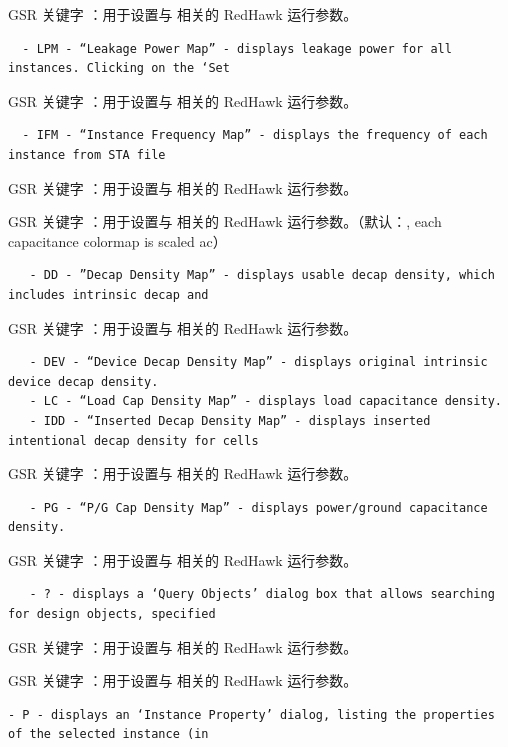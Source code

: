 GSR 关键字 ：用于设置与  相关的 RedHawk 运行参数。

\begin{lstlisting}
  - LPM - “Leakage Power Map” - displays leakage power for all instances. Clicking on the ‘Set
\end{lstlisting}

GSR 关键字 ：用于设置与  相关的 RedHawk 运行参数。

\begin{lstlisting}
  - IFM - “Instance Frequency Map” - displays the frequency of each instance from STA file
\end{lstlisting}

GSR 关键字 ：用于设置与  相关的 RedHawk 运行参数。

GSR 关键字 ：用于设置与  相关的 RedHawk 运行参数。（默认：, each capacitance colormap is scaled ac）

\begin{lstlisting}
   - DD - ”Decap Density Map” - displays usable decap density, which includes intrinsic decap and
\end{lstlisting}

GSR 关键字 ：用于设置与  相关的 RedHawk 运行参数。

\begin{lstlisting}
   - DEV - “Device Decap Density Map” - displays original intrinsic device decap density.
   - LC - “Load Cap Density Map” - displays load capacitance density.
   - IDD - “Inserted Decap Density Map” - displays inserted intentional decap density for cells
\end{lstlisting}

GSR 关键字 ：用于设置与  相关的 RedHawk 运行参数。

\begin{lstlisting}
   - PG - “P/G Cap Density Map” - displays power/ground capacitance density.
\end{lstlisting}

GSR 关键字 ：用于设置与  相关的 RedHawk 运行参数。

\begin{lstlisting}
   - ? - displays a ‘Query Objects’ dialog box that allows searching for design objects, specified
\end{lstlisting}

GSR 关键字 ：用于设置与  相关的 RedHawk 运行参数。

GSR 关键字 ：用于设置与  相关的 RedHawk 运行参数。

\begin{lstlisting}
- P - displays an ‘Instance Property’ dialog, listing the properties of the selected instance (in
\end{lstlisting}


